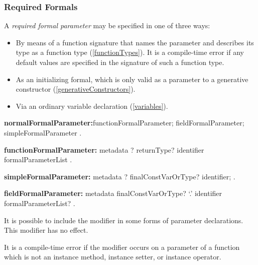 \documentclass{article}
\begin{document}
\subsubsection{Required Formals}

\LMHash{}
A {\em required formal parameter} may be specified in one of three ways:
\begin{itemize}
\item By means of a function signature that names the parameter and describes its type as a function type (\ref{functionTypes}).  It is a compile-time error if any default values are specified in the signature of such a function type.%
\item As an initializing formal, which is only valid as a parameter to a generative constructor (\ref{generativeConstructors}). %
\item Via an ordinary variable declaration (\ref{variables}).
\end{itemize}

\begin{grammar}
{\bf normalFormalParameter:}functionFormalParameter;
      fieldFormalParameter;
      simpleFormalParameter
    .

{\bf functionFormalParameter:}
      metadata \COVARIANT{}? returnType? identifier formalParameterList
    .

{\bf simpleFormalParameter:}
      metadata \COVARIANT{}? finalConstVarOrType? identifier;
    .

{\bf fieldFormalParameter:}
   metadata finalConstVarOrType? \THIS{} `{\escapegrammar .}' identifier formalParameterList?
   .
\end{grammar}

\LMHash{}
It is possible to include the modifier \COVARIANT{} in some forms of parameter declarations.
This modifier has no effect.


\LMHash{}
It is a compile-time error if the modifier \COVARIANT{} occurs on a parameter of a function which is not an instance method, instance setter, or instance operator.

\end{document}
